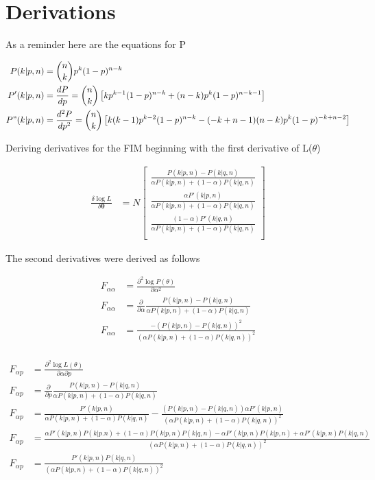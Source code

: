 \section{Derivations}

As a reminder here are the equations for P

\begin{align*}
P(k | p, n) &= \binom{n}{k}p^{k}(1 - p)^{n - k} \\
P'(k | p, n) &= \frac{dP}{dp} = \binom{n}{k}\left[kp^{k - 1}(1 - p)^{n - k} + (n - k)p^{k}(1 - p)^{n - k - 1}\right]\\
P"(k | p, n) &= \frac{d^2P}{dp^2} = \binom{n}{k}\left[k(k - 1)p^{k - 2}(1 - p)^{n - k} - (-k + n - 1)(n - k)p^k(1 - p)^{-k + n - 2} \right]\\
\end{align*}

Deriving derivatives for the FIM beginning with the first derivative of L($\theta$)

\begin{align*}
\frac{\delta \log L}{\delta \mathbf{\theta}} &= N \begin{bmatrix} 
 \frac{P(k | p, n) - P(k | q, n)}{\alpha P(k | p, n) + (1-\alpha)P(k | q, n)} \\ 
\frac{\alpha P'(k | p, n)}{\alpha P(k | p, n) + (1-\alpha)P(k | q, n)} \\ 
\frac{(1 - \alpha) P'(k | q, n)}{\alpha P(k | p, n) + (1-\alpha)P(k | q, n)} \\  \end{bmatrix}
\end{align*}

The second derivatives were derived as follows

\begin{align*}
F_{\alpha\alpha} &= \frac{\partial^2\log P(\mathbb{\theta})}{\partial\alpha^2} \\
F_{\alpha\alpha} &= \frac{\partial}{\partial\alpha}\frac{P(k | p, n) - P(k | q, n)}{\alpha P(k | p, n) + (1-\alpha)P(k | q, n)} \\
F_{\alpha\alpha} &= \frac{-(P(k | p, n) - P(k | q, n))^2}{(\alpha P(k | p, n) + (1 - \alpha) P(k | q, n))^2} \\
\end{align*}

\begin{align*}
F_{\alpha p} &= \frac{\partial^2\log L(\mathbb{\theta})}{\partial\alpha\partial p} \\
F_{\alpha p} &= \frac{\partial}{\partial p}\frac{P(k | p, n) - P(k | q, n)}{\alpha P(k | p, n) + (1-\alpha)P(k | q, n)} \\
F_{\alpha p} &= \frac{P'(k | p, n)}{\alpha P(k | p, n) + (1-\alpha)P(k | q, n)} - \frac{(P(k | p, n) - P(k | q, n))\alpha P'(k | p, n)}{(\alpha P(k | p, n) + (1 - \alpha) P(k | q, n))^2} \\
F_{\alpha p} &= \frac{\alpha P'(k | p, n)P(k | p. n) + (1 - \alpha)P(k | p, n)P(k | q, n) - \alpha P'(k | p, n)P(k | p, n) + \alpha P'(k | p, n)P(k | q, n)}{(\alpha P(k | p, n) + (1 - \alpha) P(k | q, n))^2} \\
F_{\alpha p} &= \frac{P'(k | p, n)P(k | q, n)}{(\alpha P(k | p, n) + (1 - \alpha) P(k | q, n))^2}
\end{align*}

